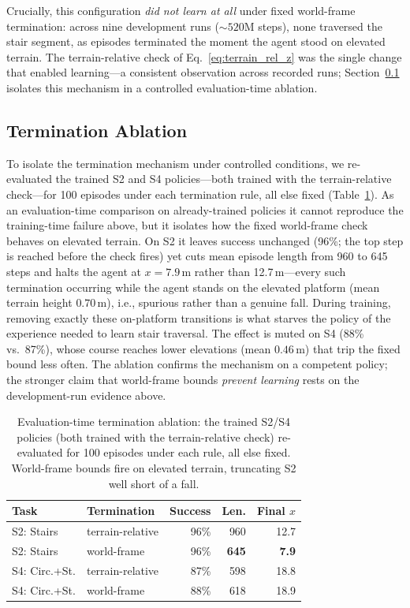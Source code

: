 \documentclass[conference,a4paper]{IEEEtran}
\begin{document}
Crucially, this configuration \emph{did not learn at all} under fixed world-frame termination: across nine development runs (${\sim}520$M steps), none traversed the stair segment, as episodes terminated the moment the agent stood on elevated terrain. The terrain-relative check of Eq.~\eqref{eq:terrain_rel_z} was the single change that enabled learning---a consistent observation across recorded runs; Section~\ref{sec:term_ablation} isolates this mechanism in a controlled evaluation-time ablation.

\subsection{Termination Ablation}
\label{sec:term_ablation}
To isolate the termination mechanism under controlled conditions, we re-evaluated the trained S2 and S4 policies---both trained with the terrain-relative check---for 100 episodes under each termination rule, all else fixed (Table~\ref{tab:term_ablation}). As an evaluation-time comparison on already-trained policies it cannot reproduce the training-time failure above, but it isolates how the fixed world-frame check behaves on elevated terrain. On S2 it leaves success unchanged (96\%; the top step is reached before the check fires) yet cuts mean episode length from 960 to 645 steps and halts the agent at $x{=}7.9$\,m rather than 12.7\,m---every such termination occurring while the agent stands on the elevated platform (mean terrain height $0.70$\,m), i.e., spurious rather than a genuine fall. During training, removing exactly these on-platform transitions is what starves the policy of the experience needed to learn stair traversal. The effect is muted on S4 (88\% vs.\ 87\%), whose course reaches lower elevations (mean $0.46$\,m) that trip the fixed bound less often. The ablation confirms the mechanism on a competent policy; the stronger claim that world-frame bounds \emph{prevent learning} rests on the development-run evidence above.

\begin{table}[t]
\centering
\caption{Evaluation-time termination ablation: the trained S2/S4 policies (both trained with the terrain-relative check) re-evaluated for 100 episodes under each rule, all else fixed. World-frame bounds fire on elevated terrain, truncating S2 well short of a fall.}
\label{tab:term_ablation}
\small
\setlength{\tabcolsep}{4pt}
\begin{tabular}{@{}llrrr@{}}
\toprule
\textbf{Task} & \textbf{Termination} & \textbf{Success} & \textbf{Len.} & \textbf{Final} $x$ \\
\midrule
S2: Stairs & terrain-relative & 96\% & 960 & 12.7 \\
S2: Stairs & world-frame & 96\% & \textbf{645} & \textbf{7.9} \\
S4: Circ.+St. & terrain-relative & 87\% & 598 & 18.8 \\
S4: Circ.+St. & world-frame & 88\% & 618 & 18.9 \\
\bottomrule
\end{tabular}
\end{table}
\end{document}
